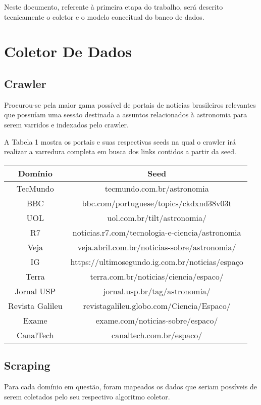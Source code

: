 \documentclass{article}
\begin{document}
Neste documento, referente à primeira etapa do trabalho, será descrito tecnicamente o coletor e o modelo conceitual do banco de dados.


\section{Coletor De Dados}

\subsection{Crawler}
Procurou-se pela maior gama possível de portais de notícias brasileiros relevantes que possuíam uma sessão destinada a assuntos relacionados à astronomia para serem varridos e indexados pelo crawler.

A Tabela 1 mostra os portais e suas respectivas seeds na qual o crawler irá realizar a varredura completa em busca dos links contidos a partir da seed.


\begin{tabular}{|c|c|}
\hline
Domínio & Seed\\\hline
TecMundo & tecmundo.com.br/astronomia \\\hline
BBC & bbc.com/portuguese/topics/ckdxnd38v03t\\\hline
UOL & uol.com.br/tilt/astronomia/\\\hline
R7 & noticias.r7.com/tecnologia-e-ciencia/astronomia \\\hline
Veja & veja.abril.com.br/noticias-sobre/astronomia/ \\\hline
IG & https://ultimosegundo.ig.com.br/noticias/espaço \\\hline
Terra & terra.com.br/noticias/ciencia/espaco/\\\hline
Jornal USP & jornal.usp.br/tag/astronomia/\\\hline
Revista Galileu & revistagalileu.globo.com/Ciencia/Espaco/\\\hline
Exame & exame.com/noticias-sobre/espaco/\\\hline
CanalTech & canaltech.com.br/espaco/\\\hline
\end{tabular}


\subsection{Scraping}
Para cada domínio em questão, foram mapeados os dados que seriam possíveis de serem coletados pelo seu respectivo algoritmo coletor.
 
\end{document}
